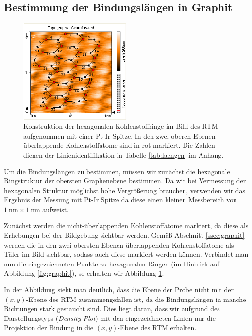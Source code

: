 \documentclass[10pt, a4paper]{article}
\begin{document}
\subsection{Bestimmung der Bindungslängen in Graphit}
\label{ssec:laenge}
\begin{figure}[!h]
\centering
\includegraphics[width=0.5\textwidth]{./grafiken/laenge.png}
\caption{Konstruktion der hexagonalen Kohlenstoffringe im Bild des RTM aufgenommen mit einer Pt-Ir Spitze. In den zwei oberen Ebenen überlappende Kohlenstoffatome sind in rot markiert. Die Zahlen dienen der Linienidentifikation in Tabelle \ref{tab:laengen} im Anhang.}
\label{fig:laengen}
\end{figure}
Um die Bindungslängen zu bestimmen, müssen wir zunächst die hexagonale Ringstruktur der obersten Graphenebene bestimmen.
Da wir bei Vermessung der hexagonalen Struktur möglichst hohe Vergrößerung brauchen, verwenden wir das Ergebnis der Messung mit Pt-Ir Spitze da diese einen kleinen Messbereich von $\SI{1}{\nano\metre} \times \SI{1}{\nano\metre}$ aufweist.

Zunächst werden die nicht-überlappenden Kohlenstoffatome markiert, da diese als Erhebungen bei der Bildgebung sichtbar werden.
Gemäß Abschnitt \ref{ssec:graphit} werden die in den zwei obersten Ebenen überlappenden Kohlenstoffatome als Täler im Bild sichtbar, sodass auch diese markiert werden können.
Verbindet man nun die eingezeichneten Punkte zu hexagonalen Ringen (im Hinblick auf Abbildung \ref{fig:graphit}), so erhalten wir Abbildung \ref{fig:laengen}.

In der Abbildung sieht man deutlich, dass die Ebene der Probe nicht mit der $(x,y)$-Ebene des RTM zusammengefallen ist, da die Bindungslängen in manche Richtungen stark gestaucht sind.
Dies liegt daran, dass wir aufgrund des Darstellungstyps (\emph{Density Plot}) mit den eingezeichneten Linien nur die Projektion der Bindung in die $(x,y)$-Ebene des RTM erhalten.
\end{document}

